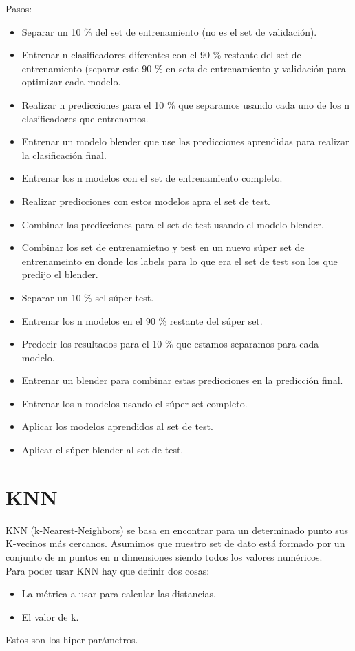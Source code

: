 \documentclass[titlepage,a4paper]{article}
\begin{document}
Pasos: 
\begin{itemize}
\item Separar un 10 \% del set de entrenamiento (no es el set de validación).
\item Entrenar n clasificadores diferentes con el 90 \% restante del set de entrenamiento (separar este 90 \% en sets de entrenamiento y validación para  optimizar cada modelo. 
\item Realizar n predicciones para el 10 \% que separamos usando cada uno de los n clasificadores que entrenamos. 
\item Entrenar un modelo blender que use las predicciones aprendidas para realizar la clasificación final. 
\item Entrenar los n modelos con el set de entrenamiento completo. 
\item Realizar predicciones con estos modelos apra el set de test. 
\item Combinar las predicciones para el set de test usando el modelo blender. 
\item Combinar los set de entrenamietno y test en un nuevo súper set de entrenameinto en donde los labels para lo que era el set de test son los que predijo el blender. 
\item Separar un 10 \% sel  súper test. 
\item Entrenar los n modelos en el 90 \% restante del súper set.
\item Predecir los resultados para el 10 \% que estamos separamos para cada modelo. 
\item Entrenar un blender para combinar estas predicciones en la predicción final. 
\item Entrenar los n modelos usando el súper-set completo. 
\item Aplicar los modelos aprendidos al set de test. 
\item Aplicar el súper blender al set de test. 
\end{itemize}


\section*{KNN}
KNN (k-Nearest-Neighbors) se basa en encontrar para un determinado punto sus K-vecinos más cercanos. Asumimos que nuestro set de dato está formado por un conjunto de m puntos en n dimensiones siendo todos los valores numéricos. \\

Para poder usar KNN hay que definir dos cosas: 
\begin{itemize}
\item La métrica a usar para calcular las distancias. 
\item El valor de k. 
\end{itemize}
Estos son los hiper-parámetros. \\
\end{document}

